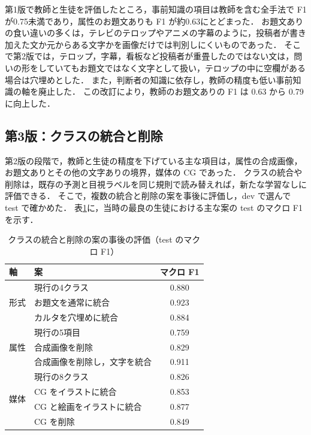 第1版で教師と生徒を評価したところ，事前知識の項目は教師を含む全手法で F1 が0.75未満であり，属性のお題文ありも F1 が約0.63にとどまった．
お題文ありの食い違いの多くは，テレビのテロップやアニメの字幕のように，投稿者が書き加えた文か元からある文字かを画像だけでは判別しにくいものであった．
そこで第2版では，テロップ，字幕，看板など投稿者が重畳したのではない文は，問いの形をしていてもお題文ではなく文字として扱い，テロップの中に空欄がある場合は穴埋めとした．
また，判断者の知識に依存し，教師の精度も低い事前知識の軸を廃止した．
この改訂により，教師のお題文ありの F1 は 0.63 から 0.79 に向上した．

\subsection{第3版：クラスの統合と削除}
第2版の段階で，教師と生徒の精度を下げている主な項目は，属性の合成画像，お題文ありとその他の文字ありの境界，媒体の CG であった．
クラスの統合や削除は，既存の予測と目視ラベルを同じ規則で読み替えれば，新たな学習なしに評価できる．
そこで，複数の統合と削除の案を事後に評価し，dev で選んで test で確かめた．
表\ref{tab_scheme}に，当時の最良の生徒における主な案の test のマクロ F1 を示す．

\begin{table}[t]
    \centering
    \caption{クラスの統合と削除の案の事後の評価（test のマクロ F1）}
    \label{tab_scheme}
    \small
    \begin{tabular}{llc}
        \toprule
        軸 & 案 & マクロ F1 \\
        \midrule
        \multirow{3}{*}{形式} & 現行の4クラス & 0.880 \\
         & お題文を通常に統合 & 0.923 \\
         & カルタを穴埋めに統合 & 0.884 \\
        \midrule
        \multirow{3}{*}{属性} & 現行の5項目 & 0.759 \\
         & 合成画像を削除 & 0.829 \\
         & 合成画像を削除し，文字を統合 & 0.911 \\
        \midrule
        \multirow{4}{*}{媒体} & 現行の8クラス & 0.826 \\
         & CG をイラストに統合 & 0.853 \\
         & CG と絵画をイラストに統合 & 0.877 \\
         & CG を削除 & 0.849 \\
        \bottomrule
    \end{tabular}
\end{table}

